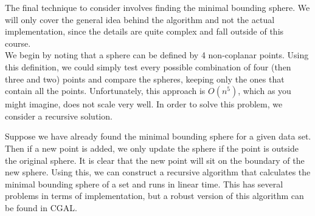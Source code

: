     The final technique to consider involves finding the minimal bounding
    sphere. We will only cover the general idea behind the algorithm and not the
    actual implementation, since the details are quite complex and fall outside
    of this course.\\
    We begin by noting that a sphere can be defined by 4 non-coplanar points.
    Using this definition, we could simply test every possible combination
    of four (then three and two) points and compare the spheres, keeping only
    the ones that contain all the points. Unfortunately, this approach is
    $O(n^5)$, which as you might imagine, does not scale very well. In order to
    solve this problem, we consider a recursive solution.

    Suppose we have already found the minimal bounding sphere for a given data
    set. Then if a new point is added, we only update the sphere if the point is
    outside the original sphere. It is clear that the new point will sit on the
    boundary of the new sphere. Using this, we can construct a recursive
    algorithm that calculates the minimal bounding sphere of a set and runs in
    linear time. This has several problems in terms of implementation, but a
    robust version of this algorithm can be found in CGAL.


